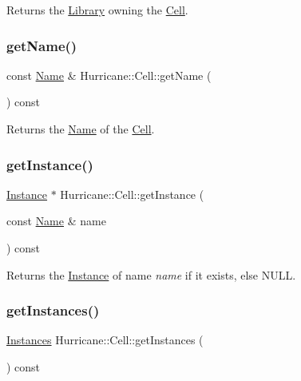 Returns the \hyperlink{classHurricane_1_1Library}{Library} owning the \hyperlink{classHurricane_1_1Cell}{Cell}. \mbox{\label{classHurricane_1_1Cell_a01cd4bba972d484496fd297648b8fa0c}} 
\subsubsection{\texorpdfstring{get\+Name()}{getName()}}
{\footnotesize\ttfamily const \hyperlink{classHurricane_1_1Name}{Name} \& Hurricane\+::\+Cell\+::get\+Name (\begin{DoxyParamCaption}{ }\end{DoxyParamCaption}) const\hspace{0.3cm}{\ttfamily [inline]}}

Returns the \hyperlink{classHurricane_1_1Name}{Name} of the \hyperlink{classHurricane_1_1Cell}{Cell}. \mbox{\label{classHurricane_1_1Cell_abaf178b24734de37cf0ac31918c096ac}} 
\subsubsection{\texorpdfstring{get\+Instance()}{getInstance()}}
{\footnotesize\ttfamily \hyperlink{classHurricane_1_1Instance}{Instance} $\ast$ Hurricane\+::\+Cell\+::get\+Instance (\begin{DoxyParamCaption}\item[{const \hyperlink{classHurricane_1_1Name}{Name} \&}]{name }\end{DoxyParamCaption}) const\hspace{0.3cm}{\ttfamily [inline]}}

Returns the \hyperlink{classHurricane_1_1Instance}{Instance} of name {\itshape name} if it exists, else {\ttfamily N\+U\+LL}. \mbox{\label{classHurricane_1_1Cell_aa85b3992431b672827167c5d9cb622f2}} 
\subsubsection{\texorpdfstring{get\+Instances()}{getInstances()}}
{\footnotesize\ttfamily \hyperlink{namespaceHurricane_ac9436b03a2926f34ad6863deae2baadc}{Instances} Hurricane\+::\+Cell\+::get\+Instances (\begin{DoxyParamCaption}{ }\end{DoxyParamCaption}) const\hspace{0.3cm}{\ttfamily [inline]}}

